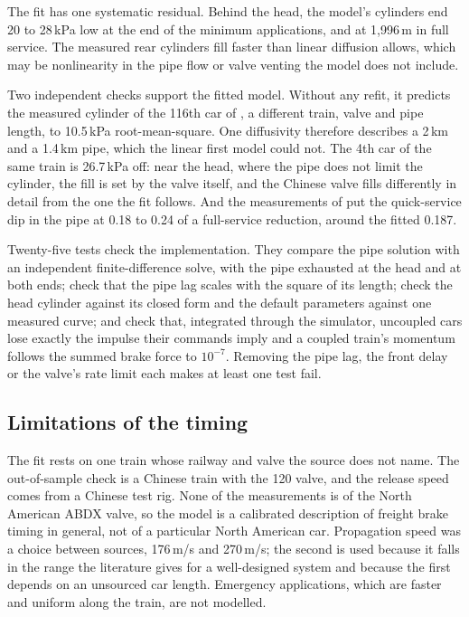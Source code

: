 The fit has one systematic residual. Behind the head, the model's cylinders end 20 to 28\,kPa low at the end of the minimum applications, and at 1,996\,m in full service. The measured rear cylinders fill faster than linear diffusion allows, which may be nonlinearity in the pipe flow or valve venting the model does not include.

Two independent checks support the fitted model. Without any refit, it predicts the measured cylinder of the 116th car of \cite{Wei2017AirBrake}, a different train, valve and pipe length, to 10.5\,kPa root-mean-square. One diffusivity therefore describes a 2\,km and a 1.4\,km pipe, which the linear first model could not. The 4th car of the same train is 26.7\,kPa off: near the head, where the pipe does not limit the cylinder, the fill is set by the valve itself, and the Chinese valve fills differently in detail from the one the fit follows. And the measurements of \cite{Wu2017AirBrakeParallel} put the quick-service dip in the pipe at 0.18 to 0.24 of a full-service reduction, around the fitted 0.187.

Twenty-five tests check the implementation. They compare the pipe solution with an independent finite-difference solve, with the pipe exhausted at the head and at both ends; check that the pipe lag scales with the square of its length; check the head cylinder against its closed form and the default parameters against one measured curve; and check that, integrated through the simulator, uncoupled cars lose exactly the impulse their commands imply and a coupled train's momentum follows the summed brake force to $10^{-7}$. Removing the pipe lag, the front delay or the valve's rate limit each makes at least one test fail.

\subsection{Limitations of the timing}

The fit rests on one train whose railway and valve the source does not name. The out-of-sample check is a Chinese train with the 120 valve, and the release speed comes from a Chinese test rig. None of the measurements is of the North American ABDX valve, so the model is a calibrated description of freight brake timing in general, not of a particular North American car. Propagation speed was a choice between sources, 176\,m/s and 270\,m/s; the second is used because it falls in the range the literature gives for a well-designed system and because the first depends on an unsourced car length. Emergency applications, which are faster and uniform along the train, are not modelled.

